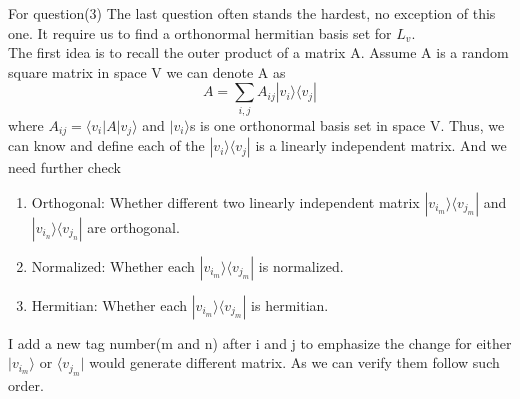 For question(3)
The last question often stands the hardest, no exception of this one. It require us to find a orthonormal hermitian basis set for $L_v$.\\
The first idea is to recall the outer product of a matrix A.
Assume A is a random square matrix in space V we can denote A as
\begin{equation}
    A = \sum_{i,j} A_{ij}|v_i\rangle\langle v_j|
\end{equation}
where $A_{ij} = \langle v_i|A|v_j\rangle$ and $|v_i\rangle$s is one orthonormal basis set in space V.
Thus, we can know and define each of the $|v_i\rangle\langle v_j|$ is a linearly independent matrix. And we need further check 
\begin{enumerate}
    \item Orthogonal: Whether different two linearly independent matrix $|v_i_m\rangle\langle v_j_m|$ and  $|v_i_n\rangle\langle v_j_n|$ are orthogonal. 
    \item Normalized: Whether each $|v_i_m\rangle\langle v_j_m|$ is normalized.
    \item Hermitian: Whether each $|v_i_m\rangle\langle v_j_m|$ is hermitian.
\end{enumerate}
I add a new tag number(m and n) after i and j to emphasize the change for either $|v_i_m\rangle$ or $\langle v_j_m|$ would generate different matrix. As we can verify them follow such order.
